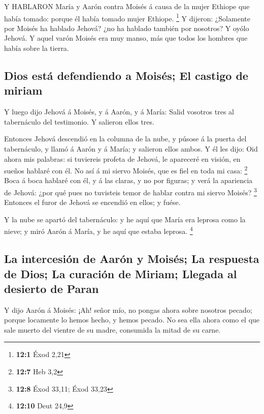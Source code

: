  Y HABLARON María y Aarón contra Moisés á causa de la mujer
Ethiope que había tomado: porque él había tomado mujer Ethiope.
\footnote{\textbf{12:1} Éxod 2,21}  Y dijeron: ¿Solamente
por Moisés ha hablado Jehová? ¿no ha hablado también por nosotros? Y
oyólo Jehová.  Y aquel varón Moisés era muy manso, más que
todos los hombres que había sobre la tierra.

\hypertarget{dios-estuxe1-defendiendo-a-moisuxe9s-el-castigo-de-miriam}{%
\subsection{Dios está defendiendo a Moisés; El castigo de
miriam}\label{dios-estuxe1-defendiendo-a-moisuxe9s-el-castigo-de-miriam}}

 Y luego dijo Jehová á Moisés, y á Aarón, y á María: Salid
vosotros tres al tabernáculo del testimonio. Y salieron ellos tres.

 Entonces Jehová descendió en la columna de la nube, y
púsose á la puerta del tabernáculo, y llamó á Aarón y á María; y
salieron ellos ambos.  Y él les dijo: Oid ahora mis
palabras: si tuviereis profeta de Jehová, le apareceré en visión, en
sueños hablaré con él.  No así á mi siervo Moisés, que es
fiel en toda mi casa: \footnote{\textbf{12:7} Heb 3,2}  Boca
á boca hablaré con él, y á las claras, y no por figuras; y verá la
apariencia de Jehová: ¿por qué pues no tuvisteis temor de hablar contra
mi siervo Moisés? \footnote{\textbf{12:8} Éxod 33,11; Éxod 33,23}
 Entonces el furor de Jehová se encendió en ellos; y fuése.

 Y la nube se apartó del tabernáculo: y he aquí que María
era leprosa como la nieve; y miró Aarón á María, y he aquí que estaba
leprosa. \footnote{\textbf{12:10} Deut 24,9}

\hypertarget{la-intercesiuxf3n-de-aaruxf3n-y-moisuxe9s-la-respuesta-de-dios-la-curaciuxf3n-de-miriam-llegada-al-desierto-de-paran}{%
\subsection{La intercesión de Aarón y Moisés; La respuesta de Dios; La
curación de Miriam; Llegada al desierto de
Paran}\label{la-intercesiuxf3n-de-aaruxf3n-y-moisuxe9s-la-respuesta-de-dios-la-curaciuxf3n-de-miriam-llegada-al-desierto-de-paran}}

 Y dijo Aarón á Moisés: ¡Ah! señor mío, no pongas ahora
sobre nosotros pecado; porque locamente lo hemos hecho, y hemos pecado.
 No sea ella ahora como el que sale muerto del vientre de
su madre, consumida la mitad de su carne.

